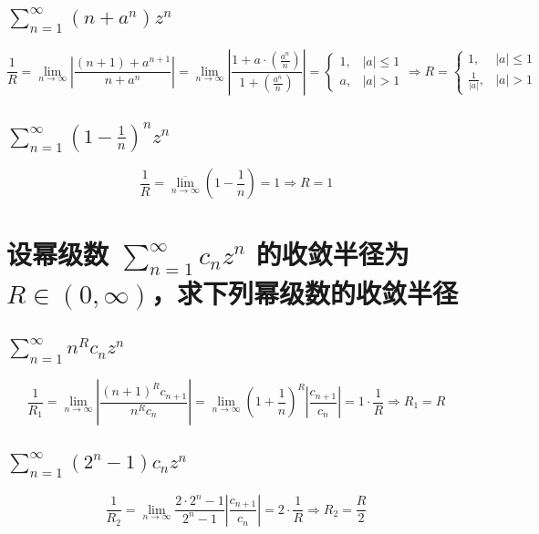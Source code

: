 \documentclass[UTF8]{report}
\theoremstyle{MyLineTheoremStyle} %
\theoremstyle{MyBlockTheoremStyle} %
\theoremstyle{MySubsubsectionStyle} %
\begin{document}
\subsection{$\displaystyle \sum_{n=1}^{\infty} (n + a^n) z^n$}
\noindent
\begin{equation}
\frac{1}{R} 
= \lim_{n \to \infty} \left| \frac{(n+1) + a^{n+1}}{n + a^n} \right| 
= \lim_{n \to \infty} \left|\frac{1 + a\cdot \left(\frac{a^n}{n}\right)}{1 + \left(\frac{a^n}{n}\right)} \right| 
= \begin{cases}
    1, & | a | \leqslant 1 \\
    a, & | a | > 1
\end{cases}\Longrightarrow 
R =
\begin{cases}
    1, & | a | \leqslant 1 \\
    \frac{1}{|a|}, & | a | > 1
\end{cases}
\end{equation}

\subsection{$\displaystyle \sum_{n=1}^{\infty} (1 - \frac{1}{n})^n z^n$}
\noindent
\begin{equation}
\frac{1}{R} = \overline{\lim_{n \to \infty}} \left(1 - \frac{1}{n}\right) = 1 \Longrightarrow R = 1
\end{equation}

\section{设幂级数 $\sum_{n=1}^{\infty} c_n z^n$ 的收敛半径为 $R \in (0,\infty)$，求下列幂级数的收敛半径}

\subsection{$\displaystyle \sum_{n=1}^{\infty} n^Rc_n z^n$}
\noindent
\begin{equation}
\frac{1}{R_1} 
= \lim_{n \to \infty} \left| \frac{(n+1)^R c_{n+1}}{n^R c_n} \right|
= \lim_{n \to \infty} \left(1 + \frac{1}{n}\right)^R \left| \frac{c_{n+1}}{c_n} \right|
= 1 \cdot \frac{1}{R} \Longrightarrow R_1 = R
\end{equation}

\subsection{$\displaystyle \sum_{n=1}^{\infty} (2^n - 1)c_n z^n$}
\noindent
\begin{equation}
\frac{1}{R_2} 
= \lim_{n \to \infty} \frac{2\cdot 2^n - 1}{2^n - 1} \left| \frac{c_{n+1}}{c_n} \right|
= 2\cdot \frac{1}{R} \Longrightarrow R_2 = \frac{R}{2}
\end{equation}
\end{document}
